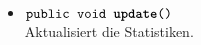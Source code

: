\begin{description}
\begin{itemize}
				\item $\texttt{public void \textbf{update}()}$ \\ Aktualisiert die Statistiken.
				
				
					
			
		
	\end{itemize}
\end{description}
